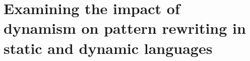 \chapter{Examining the impact of dynamism on pattern rewriting in static and dynamic languages}
\label{chap:dynamism-pattern-rewriting}












